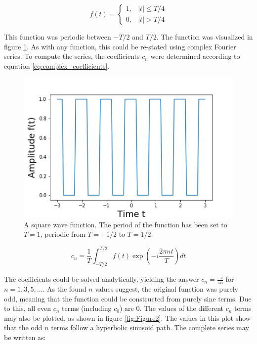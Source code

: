 \documentclass[twocolumn]{article}
\begin{document}
\[ 
f(t)=
\begin{cases}
1, & |t| \leq T/4 \label{eq:square}
\\
0, & |t| > T/4
\end{cases}
\]

This function was periodic between $-T/2$ and $T/2$. The function was visualized in figure \ref{fig:square}. As with any function, this could be re-stated using complex Fourier series. To compute the series, the coefficients $c_n$ were determined according to equation \ref{eq:complex_coefficients}. 

\begin{figure}
\centering
\includegraphics[width=\linewidth]{Figure1}
\caption{A square wave function. The period of the function has been set to $T=1$, periodic from $T=-1/2$ to $T=1/2$.}
\label{fig:square}
\end{figure}

\begin{equation}
c_n = \frac{1}{T} \int_{-T/2}^{T/2} f(t) \exp(-i\frac{2\pi nt}{T}) dt
\label{eq:complex_coefficients}
\end{equation}

The coefficients could be solved analytically, yielding the answer $c_n = \frac{-i}{\pi n}$ for $n = 1, 3, 5, ...$. As the found $n$ values suggest, the original function was purely odd, meaning that the function could be constructed from purely sine terms. Due to this, all even $c_n$ terms (including $c_0$) are $0$. The values of the different $c_n$ terms may also be plotted, as shown in figure \ref{fig:Figure2}. The values in this plot show that the odd $n$ terms follow a hyperbolic sinusoid path. The complete series may be written as:
\end{document}
